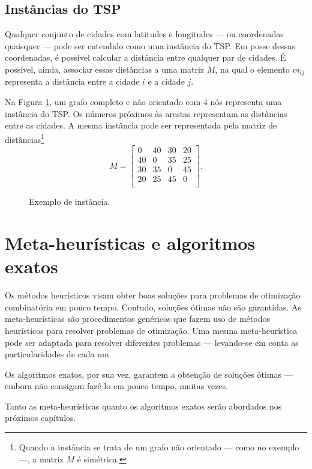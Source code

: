 \subsection{Instâncias do TSP}
Qualquer conjunto de cidades com latitudes e longitudes --- ou coordenadas quaisquer --- pode ser entendido como uma instância do TSP. Em posse dessas coordenadas, é possível calcular a distância entre qualquer par de cidades. É possível, ainda, associar essas distâncias a uma matriz \(M\), na qual o elemento \(m_{ij}\) representa a distância entre a cidade \(i\) e a cidade \(j\).

Na Figura \ref{fig:instanciaTSP}, um grafo completo e não orientado com 4 nós representa uma instância do TSP. Os números próximos às arestas representam as distâncias entre as cidades. A mesma instância pode ser representada pela matriz de distâncias\footnote{Quando a instância se trata de um grafo não orientado --- como no exemplo ---, a matriz \(M\) é simétrica.} \[M = \begin{bmatrix}
0 & 40 & 30 & 20  \\
40 & 0 & 35 & 25  \\
30 & 35 & 0 & 45  \\
20 & 25 & 45 & 0  \\
\end{bmatrix}.\]

\begin{figure}[!htbp]
    \centering

    \caption{Exemplo de instância.}
    \label{fig:instanciaTSP}
\end{figure}

\section{Meta-heurísticas e algoritmos exatos}
Os métodos heurísticos visam obter boas soluções para problemas de otimização combinatória em pouco tempo. Contudo, soluções ótimas não são garantidas. As meta-heurísticas são procedimentos genéricos que fazem uso de métodos heurísticos para resolver problemas de otimização. Uma mesma meta-heurística pode ser adaptada para resolver diferentes problemas --- levando-se em conta as particularidades de cada um. 

Os algoritmos exatos, por sua vez, garantem a obtenção de soluções ótimas --- embora não consigam fazê-lo em pouco tempo, muitas vezes.

Tanto as meta-heurísticas quanto os algoritmos exatos serão abordados nos próximos capítulos.
